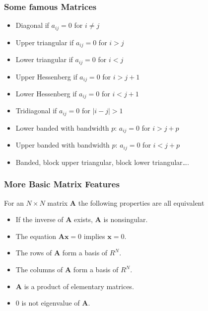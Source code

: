 \documentclass[letterpaper,10pt,english]{sphinxmanual}
\begin{document}
\subsubsection{Some famous Matrices}
\label{\detokenize{chapter2:some-famous-matrices}}\begin{itemize}
\item {} 
Diagonal if \(a_{ij}=0\) for \(i\ne j\)

\item {} 
Upper triangular if \(a_{ij}=0\) for \(i > j\)

\item {} 
Lower triangular if \(a_{ij}=0\) for \(i < j\)

\item {} 
Upper Hessenberg if \(a_{ij}=0\) for \(i > j+1\)

\item {} 
Lower Hessenberg if \(a_{ij}=0\) for \(i < j+1\)

\item {} 
Tridiagonal if \(a_{ij}=0\) for \(|i -j| > 1\)

\item {} 
Lower banded with bandwidth \(p\): \(a_{ij}=0\) for \(i > j+p\)

\item {} 
Upper banded with bandwidth \(p\): \(a_{ij}=0\) for \(i < j+p\)

\item {} 
Banded, block upper triangular, block lower triangular….

\end{itemize}


\subsubsection{More Basic Matrix Features}
\label{\detokenize{chapter2:more-basic-matrix-features}}

For an \(N\times N\) matrix  \(\mathbf{A}\) the following properties are all equivalent
\begin{itemize}
\item {} 
If the inverse of \(\mathbf{A}\) exists, \(\mathbf{A}\) is nonsingular.

\item {} 
The equation \(\mathbf{Ax}=0\) implies \(\mathbf{x}=0\).

\item {} 
The rows of \(\mathbf{A}\) form a basis of \(R^N\).

\item {} 
The columns of \(\mathbf{A}\) form a basis of \(R^N\).

\item {} 
\(\mathbf{A}\) is a product of elementary matrices.

\item {} 
\(0\) is not eigenvalue of \(\mathbf{A}\).

\end{itemize}
\end{document}
